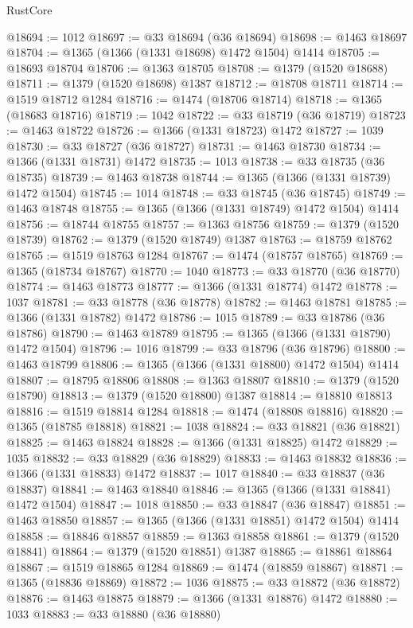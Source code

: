 \begin{lexlean}{RustCore}
\begin{coremodule}
@18694 := 1012
@18697 := @33 @18694 (@36 @18694)
@18698 := @1463 @18697
@18704 := @1365 (@1366 (@1331 @18698) @1472 @1504) @1414
@18705 := @18693 @18704
@18706 := @1363 @18705
@18708 := @1379 (@1520 @18688)
@18711 := @1379 (@1520 @18698) @1387
@18712 := @18708 @18711
@18714 := @1519 @18712 @1284
@18716 := @1474 (@18706 @18714)
@18718 := @1365 (@18683 @18716)
@18719 := 1042
@18722 := @33 @18719 (@36 @18719)
@18723 := @1463 @18722
@18726 := @1366 (@1331 @18723) @1472
@18727 := 1039
@18730 := @33 @18727 (@36 @18727)
@18731 := @1463 @18730
@18734 := @1366 (@1331 @18731) @1472
@18735 := 1013
@18738 := @33 @18735 (@36 @18735)
@18739 := @1463 @18738
@18744 := @1365 (@1366 (@1331 @18739) @1472 @1504)
@18745 := 1014
@18748 := @33 @18745 (@36 @18745)
@18749 := @1463 @18748
@18755 := @1365 (@1366 (@1331 @18749) @1472 @1504) @1414
@18756 := @18744 @18755
@18757 := @1363 @18756
@18759 := @1379 (@1520 @18739)
@18762 := @1379 (@1520 @18749) @1387
@18763 := @18759 @18762
@18765 := @1519 @18763 @1284
@18767 := @1474 (@18757 @18765)
@18769 := @1365 (@18734 @18767)
@18770 := 1040
@18773 := @33 @18770 (@36 @18770)
@18774 := @1463 @18773
@18777 := @1366 (@1331 @18774) @1472
@18778 := 1037
@18781 := @33 @18778 (@36 @18778)
@18782 := @1463 @18781
@18785 := @1366 (@1331 @18782) @1472
@18786 := 1015
@18789 := @33 @18786 (@36 @18786)
@18790 := @1463 @18789
@18795 := @1365 (@1366 (@1331 @18790) @1472 @1504)
@18796 := 1016
@18799 := @33 @18796 (@36 @18796)
@18800 := @1463 @18799
@18806 := @1365 (@1366 (@1331 @18800) @1472 @1504) @1414
@18807 := @18795 @18806
@18808 := @1363 @18807
@18810 := @1379 (@1520 @18790)
@18813 := @1379 (@1520 @18800) @1387
@18814 := @18810 @18813
@18816 := @1519 @18814 @1284
@18818 := @1474 (@18808 @18816)
@18820 := @1365 (@18785 @18818)
@18821 := 1038
@18824 := @33 @18821 (@36 @18821)
@18825 := @1463 @18824
@18828 := @1366 (@1331 @18825) @1472
@18829 := 1035
@18832 := @33 @18829 (@36 @18829)
@18833 := @1463 @18832
@18836 := @1366 (@1331 @18833) @1472
@18837 := 1017
@18840 := @33 @18837 (@36 @18837)
@18841 := @1463 @18840
@18846 := @1365 (@1366 (@1331 @18841) @1472 @1504)
@18847 := 1018
@18850 := @33 @18847 (@36 @18847)
@18851 := @1463 @18850
@18857 := @1365 (@1366 (@1331 @18851) @1472 @1504) @1414
@18858 := @18846 @18857
@18859 := @1363 @18858
@18861 := @1379 (@1520 @18841)
@18864 := @1379 (@1520 @18851) @1387
@18865 := @18861 @18864
@18867 := @1519 @18865 @1284
@18869 := @1474 (@18859 @18867)
@18871 := @1365 (@18836 @18869)
@18872 := 1036
@18875 := @33 @18872 (@36 @18872)
@18876 := @1463 @18875
@18879 := @1366 (@1331 @18876) @1472
@18880 := 1033
@18883 := @33 @18880 (@36 @18880)

\end{coremodule}
\end{lexlean}
